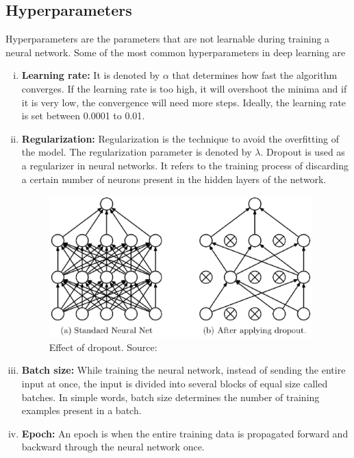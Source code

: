 \subsection{Hyperparameters}
 	Hyperparameters are the parameters that are not learnable during training a neural network. Some of the most common hyperparameters in deep learning are
\begin{enumerate}[(i)]
\item \textbf{Learning rate:} It is denoted by $\alpha$ that determines how fast the algorithm converges. If the learning rate is too high, it will overshoot the minima and if it is very low, the convergence will need more steps. Ideally, the learning rate is set between 0.0001 to 0.01.
\item \textbf{Regularization:} Regularization is the technique to avoid the overfitting of the model. The regularization parameter is denoted by $\lambda$. Dropout is used as a regularizer in neural networks. It refers to the training process of discarding a certain number of neurons present in the hidden layers of the network.
\begin{figure}
\centering
\includegraphics[width=4in,scale=1]{images/dropout.eps}
\caption[Effect of dropout]{Effect of dropout. Source: \citep{srivastava2014dropout}}
\label{fig:Dropout}
\end{figure}
\item \textbf{Batch size:} While training the neural network, instead of sending the entire input at once, the input is divided into several blocks of equal size called batches. In simple words, batch size determines the number of training examples present in a batch.
\item \textbf{Epoch:} An epoch is when the entire training data is propagated forward and backward through the neural network once.
\end{enumerate}

